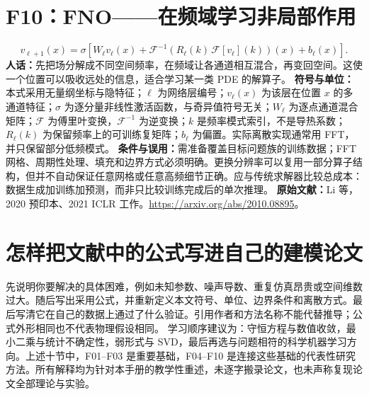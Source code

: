 \section{F10：FNO——在频域学习非局部作用}
\begin{equation}
 v_{\ell+1}(x)=\sigma\!\left[
 W_\ell v_\ell(x)+\mathcal F^{-1}\!\left(R_\ell(k)\,\mathcal F[v_\ell](k)\right)(x)+b_\ell(x)
 \right].
\end{equation}
\textbf{人话：}先把场分解成不同空间频率，在频域让各通道相互混合，再变回空间。这使一个位置可以吸收远处的信息，适合学习某一类 PDE 的解算子。
\textbf{符号与单位：}本式采用无量纲坐标与隐特征；$\ell$ 为网络层编号；$v_\ell(x)$ 为该层在位置 $x$ 的多通道特征；$\sigma$ 为逐分量非线性激活函数，与奇异值符号无关；$W_\ell$ 为逐点通道混合矩阵；$\mathcal F$ 为傅里叶变换，$\mathcal F^{-1}$ 为逆变换；$k$ 是频率模式索引，不是导热系数；$R_\ell(k)$ 为保留频率上的可训练复矩阵；$b_\ell$ 为偏置。实际离散实现通常用 FFT，并只保留部分低频模式。
\textbf{条件与误用：}需准备覆盖目标问题族的训练数据；FFT 网格、周期性处理、填充和边界方式必须明确。更换分辨率可以复用一部分算子结构，但并不自动保证任意网格或任意高频细节正确。应与传统求解器比较总成本：数据生成加训练加预测，而非只比较训练完成后的单次推理。
\textbf{原始文献：}Li 等，2020 预印本、2021 ICLR 工作。\url{https://arxiv.org/abs/2010.08895}。

\section{怎样把文献中的公式写进自己的建模论文}
先说明你要解决的具体困难，例如未知参数、噪声导数、重复仿真昂贵或空间维数过大。随后写出采用公式，并重新定义本文符号、单位、边界条件和离散方式。最后写清它在自己的数据上通过了什么验证。引用作者和方法名称不能代替推导；公式外形相同也不代表物理假设相同。
学习顺序建议为：守恒方程与数值收敛，最小二乘与统计不确定性，弱形式与 SVD，最后再选与问题相符的科学机器学习方向。上述十节中，F01--F03 是重要基础，F04--F10 是连接这些基础的代表性研究方法。所有解释均为针对本手册的教学性重述，未逐字搬录论文，也未声称复现论文全部理论与实验。
